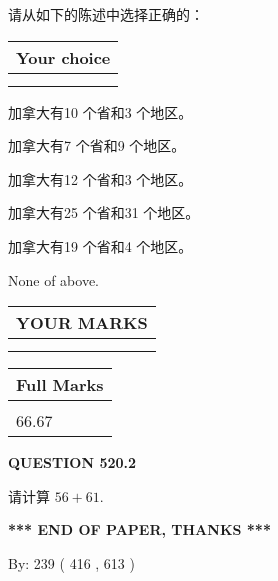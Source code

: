 \documentclass{ctexart}
\begin{document}
  
请从如下的陈述中选择正确的：
  
  
\noindent\hspace{3.0in} \begin{tabular}{|l|}
\hline
Your choice \\
\hline
 \\ 
 \\ 
\hline
\end{tabular}
  
  
 
 
加拿大有10 个省和3 个地区。
 
 
加拿大有7 个省和9 个地区。
 
 
加拿大有12 个省和3 个地区。
 
 
加拿大有25 个省和31 个地区。
 
 
加拿大有19 个省和4 个地区。
 
 
 None of above.
 
 
  
\vspace{0.2in}
  
\noindent\begin{tabular}{|l|}
\hline
 YOUR MARKS  \\
\hline
 \\ 
 \\ 
\hline
\end{tabular}
\hspace{0.05in} \begin{tabular}{|l|}
\hline
 Full Marks  \\
\hline
 \\ 
66.67 \\
\hline
\end{tabular}
{\textbf{\Large{QUESTION
520.2 
}}}
  
  
 
请计算 $ %
56 +  %
61 $.
 

 

 
   
   
 \vspace{0.2in}
 
   
   
   
   
\vspace{1.0in} 
{\textbf{\large{ *** END OF PAPER, THANKS *** }}} 
   
   
\hspace{1.0in} By: 
 239 ( 416 ,  613 )
   
\end{document}
